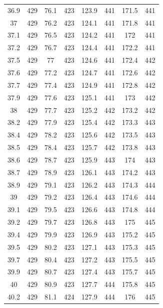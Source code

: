 \documentclass[12pt]{ctexart}
\numberwithin{equation}{section}
\begin{document}
\begin{longtable}{cc|cc|cc|cc}
36.9  &  429  &  76.1  &  423  &  123.9  &  441  &  171.5  &  441  \\
37  &  429  &  76.2  &  423  &  124.1  &  441  &  171.8  &  441  \\
37.1  &  429  &  76.5  &  423  &  124.2  &  441  &  172  &  441  \\
37.2  &  429  &  76.7  &  423  &  124.4  &  441  &  172.2  &  441  \\
37.5  &  429  &  77  &  423  &  124.6  &  441  &  172.4  &  442  \\
37.6  &  429  &  77.2  &  423  &  124.7  &  441  &  172.6  &  442  \\
37.7  &  429  &  77.4  &  423  &  124.9  &  441  &  172.8  &  442  \\
37.9  &  429  &  77.6  &  423  &  125.1  &  441  &  173  &  442  \\
38  &  429  &  77.7  &  423  &  125.2  &  442  &  173.2  &  442  \\
38.2  &  429  &  77.9  &  423  &  125.4  &  442  &  173.3  &  443  \\
38.4  &  429  &  78.2  &  423  &  125.6  &  442  &  173.5  &  443  \\
38.5  &  429  &  78.4  &  423  &  125.7  &  442  &  173.8  &  443  \\
38.6  &  429  &  78.7  &  423  &  125.9  &  443  &  174  &  443  \\
38.7  &  429  &  78.9  &  423  &  126.1  &  443  &  174.2  &  443  \\
38.9  &  429  &  79.1  &  423  &  126.2  &  443  &  174.3  &  444  \\
39  &  429  &  79.2  &  423  &  126.4  &  443  &  174.6  &  444  \\
39.1  &  429  &  79.5  &  423  &  126.6  &  443  &  174.8  &  444  \\
39.2  &  429  &  79.7  &  423  &  126.8  &  443  &  175  &  445  \\
39.4  &  429  &  79.9  &  423  &  126.9  &  443  &  175.2  &  445  \\
39.5  &  429  &  80.2  &  423  &  127.1  &  443  &  175.3  &  445  \\
39.7  &  429  &  80.4  &  423  &  127.2  &  443  &  175.5  &  445  \\
39.9  &  429  &  80.7  &  423  &  127.4  &  443  &  175.7  &  445  \\
40  &  429  &  80.9  &  423  &  127.7  &  444  &  175.8  &  445  \\
40.2  &  429  &  81.1  &  424  &  127.9  &  444  &  176  &  445  \\

\end{longtable}
\end{document}
